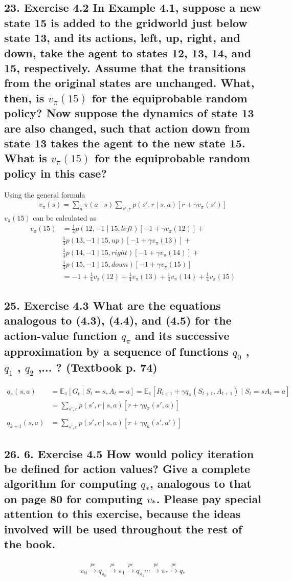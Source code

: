 \subsection*{23. Exercise 4.2 In Example 4.1, suppose a new state 15 is added to the gridworld just below state 13, and its actions, left, up, right, and down, take the agent to states 12, 13, 14, and 15, respectively. Assume that the transitions from the original states are unchanged. What, then, is $v_\pi(15)$ for the equiprobable random policy? Now suppose the dynamics of state 13 are also changed, such that action down from state 13 takes the agent to the new state 15. What is $v_\pi(15)$ for the equiprobable random policy in this case?}
Using the general formula
\begin{align*}
v_\pi(s) = \sum_a \pi(a \mid s) \sum_{s', r} p(s', r \mid s, a)[r + \gamma v_\pi(s')]
\end{align*}
$v_\pi(15)$ can be calculated as
\begin{align*}
v_\pi(15) &=\frac{1}{4} p(12, -1 \mid 15, left)[-1 + \gamma v_\pi(12)] + \\
&\frac{1}{4} p(13, -1 \mid 15, up)[-1 + \gamma v_\pi(13)] + \\
&\frac{1}{4} p(14, -1 \mid 15, right)[-1 + \gamma v_\pi(14)] + \\
&\frac{1}{4} p(15, -1 \mid 15, down)[-1 + \gamma v_\pi(15)] \\
&= -1 + \frac{1}{4} v_\pi(12) + \frac{1}{4} v_\pi(13) + \frac{1}{4}v_\pi(14) + \frac{1}{4}v_\pi(15)
\end{align*}

\subsection*{25. Exercise 4.3 What are the equations analogous to (4.3), (4.4), and (4.5) for the action-value function $q_\pi$ and its successive approximation by a sequence of functions $q_0$ , $q_1$ , $q_2$ ,... ? (Textbook p. 74)}
\begin{align*}
q_\pi(s, a) &= \mathbb{E}_\pi[G_t \mid S_t = s, A_t = a] = \mathbb{E}_\pi[R_{t+1} + \gamma q_\pi(S_{t+1}, A_{t+1}) \mid S_t = s A_t = a] \\
&= \sum_{s', r} p(s', r \mid s, a)[r + \gamma q_\pi(s', a)] \\ \\
q_{k+1}(s, a) &= \sum_{s', r} p(s', r \mid s, a)[r + \gamma q_k(s', a')]
\end{align*}

\newpage
\subsection*{26. 6. Exercise 4.5 How would policy iteration be defined for action values? Give a complete algorithm for computing $q_\ast$, analogous to that on page 80 for computing $v_\ast$. Please pay special attention to this exercise, because the ideas involved will be used throughout the rest of the book.}
\begin{align*}
\pi_0 \xrightarrow{pe} q_{\pi_0} \xrightarrow{pi} \pi_1 \xrightarrow{pe} q_{\pi_1} \cdots \xrightarrow{pi} \pi_\ast \xrightarrow{pe} q_\ast
\end{align*}


